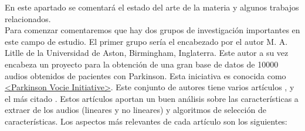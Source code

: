 
En este apartado se comentará el estado del arte de la materia y algunos trabajos relacionados.\\

Para comenzar comentaremos que hay dos grupos de investigación importantes en este campo de estudio. El primer grupo sería el encabezado por el autor M. A. Litlle de la Universidad de Aston, Birmingham, Inglaterra. Este autor a su vez encabeza un proyecto para la obtención de una gran base de datos de 10000 audios obtenidos de pacientes con Parkinson. Esta iniciativa es conocida como \href{http://www.parkinsonsvoice.org/}{<Parkinson Vocie Initiative>}. Este conjunto de autores tiene varios artículos \cite{MxLtAccurate}, \cite{MxLtNovel} y el más citado \cite{MxLtSuitability}. Estos artículos aportan un buen análisis sobre las características a extraer de los audios (lineares y no lineares) y algoritmos de selección de características. Los aspectos más relevantes de cada artículo son los siguientes:
